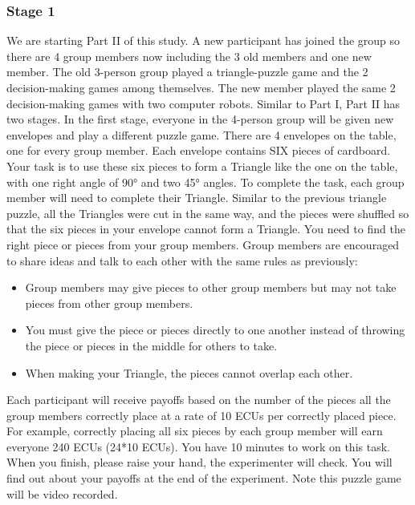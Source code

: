 \subsubsection{\textbf{Stage 1}}
\newline
We are starting Part II of this study. A new participant has joined the group so there are 4 group members now including the 3 old members and one new member. The old 3-person group played a triangle-puzzle game and the 2 decision-making games among themselves. The new member played the same 2 decision-making games with two computer robots. 
Similar to Part I, Part II has two stages. In the first stage, everyone in the 4-person group will be given new envelopes and play a different puzzle game.   
There are 4 envelopes on the table, one for every group member. Each envelope contains SIX pieces of cardboard. Your task is to use these six pieces to form a Triangle like the one on the table, with one right angle of 90° and two 45° angles. To complete the task, each group member will need to complete their Triangle. 
Similar to the previous triangle puzzle, all the Triangles were cut in the same way, and the pieces were shuffled so that the six pieces in your envelope cannot form a Triangle. You need to find the right piece or pieces from your group members. Group members are encouraged to share ideas and talk to each other with the same rules as previously: 
\begin{itemize}
    \item Group members may give pieces to other group members but may not take pieces from other group members.
    \item You must give the piece or pieces directly to one another instead of throwing the piece or pieces in the middle for others to take. 
    \item When making your Triangle, the pieces cannot overlap each other.
\end{itemize}
Each participant will receive payoffs based on the number of the pieces all the group members correctly place at a rate of 10 ECUs per correctly placed piece. For example, correctly placing all six pieces by each group member will earn everyone 240 ECUs (24*10 ECUs). 
You have 10 minutes to work on this task. When you finish, please raise your hand, the experimenter will check. You will find out about your payoffs at the end of the experiment. Note this puzzle game will be video recorded.
\newline
